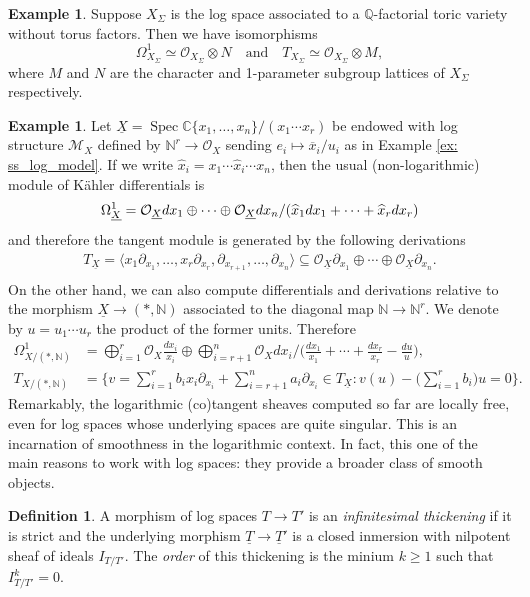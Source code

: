 \documentclass[reqno]{amsart}
\newcommand\C{\mathbb{C}}
\newcommand\N{\mathbb{N}}
\newcommand\Q{\mathbb{Q}}
\newcommand{\OO}{\mathcal{O}}
\DeclareMathOperator{\Spec}{Spec}
\newcommand{\M}{\mathcal{M}}
\theoremstyle{definition}
\newtheorem{definition}[theorem]{Definition}
\newtheorem{example}[theorem]{Example}
\theoremstyle{named}
\begin{document}
\begin{example} \label{ex: tangente_toric}
Suppose $X_\Sigma$ is the log space associated to a $\Q$-factorial toric variety without torus factors. Then we have isomorphisms
\[
\Omega^1_{X_\Sigma}\simeq \OO_{X_\Sigma}\otimes N \quad\text{and}\quad T_{X_\Sigma}\simeq \OO_{X_\Sigma}\otimes M,
\]
where $M$ and $N$ are the character and 1-parameter subgroup lattices of $X_\Sigma$ respectively.
\end{example}

\begin{example}\label{ex:tangent_underline}
Let $\underline{X} = \Spec \C\{x_1,\dots,x_n\}/(x_1\cdots x_r)$ be endowed with log structure $\M_X$ defined by $\N^r\to \OO_X$ sending $e_i\mapsto \overline{x}_i/u_i$ as in Example \ref{ex: ss_log_model}. If we write $\hat{x}_i = x_1\cdots \hat{x}_i\cdots x_n$, then the usual (non-logarithmic) module of Kähler differentials is
\[
\Omega^1_{\underline{X}} = \OO_{\underline{X}} dx_1\oplus\cdots \oplus\OO_{\underline{X}} dx_n / (\widehat{x}_1dx_1+\cdots+\widehat{x}_rdx_r)\\
\] and therefore the tangent module is generated by the following derivations
\begin{align*}
T_{\underline{X}} = \big\langle x_1\partial_{x_1},\dots,x_r\partial_{x_r},\partial_{x_{r+1}},\dots, \partial_{x_n}\big\rangle\subseteq \OO_{\underline{X}} \partial_{x_1}\oplus\cdots \oplus\OO_{\underline{X}} \partial_{x_n}.\\
\end{align*}
On the other hand, we can also compute differentials and derivations relative to the morphism $\underline{X}\rightarrow (\ast,\N)$ associated to the diagonal map $\N\rightarrow \N^r$. We denote by $u = u_1\cdots u_r$ the product of the former units. Therefore
\begin{align*}
\Omega^1_{X/(\ast,\N)} & =\bigoplus_{i=1}^r\OO_{X} \frac{dx_i}{x_i}\oplus\bigoplus_{i=r+1}^n\OO_{X} dx_{i}\Big/\Big (\frac{dx_1}{x_1}+\cdots+\frac{dx_r}{x_r}-\frac{du}{u}\Big),\\
T_{X/(\ast,\N)} & = \bigg\{v=\sum^r_{i=1} b_i x_i\partial_{x_i} + \sum^n_{i=r+1} a_i\partial_{x_i}  \in T_{\underline{X}}: v(u) - \bigg(\sum^r_{i=1} b_i\bigg)u=0\bigg\}.
\end{align*}
Remarkably, the logarithmic (co)tangent sheaves computed so far are locally free, even for log spaces whose underlying spaces are quite singular.  This is an incarnation of smoothness in the logarithmic context. In fact, this one of the main reasons to work with log spaces: they provide a broader class of smooth objects.
\end{example}
\begin{definition}
A morphism of log spaces $T\rightarrow T'$ is an \textit{infinitesimal thickening} if it is strict and the underlying morphism $\underline{T}\rightarrow \underline{T}'$ is a closed inmersion with nilpotent sheaf of ideals $I_{T/T'}$. The \textit{order} of this thickening is the minium $k\geqslant 1$ such that $I_{T/T'}^k = 0$.
\end{definition}
\end{document}
